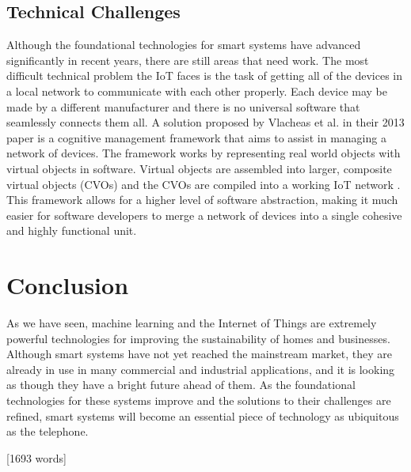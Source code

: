 \documentclass[letterpaper]{article}
\begin{document}
\subsection{Technical Challenges}
Although the foundational technologies for smart systems have advanced significantly in recent years, there are still areas that need work. The most difficult technical problem the IoT faces is the task of getting all of the devices in a local network to communicate with each other properly. Each device may be made by a different manufacturer and there is no universal software that seamlessly connects them all. A solution proposed by Vlacheas et al. \cite{vlacheas13} in their 2013 paper is a cognitive management framework that aims to assist in managing a network of devices. The framework works by representing real world objects with virtual objects in software. Virtual objects are assembled into larger, composite virtual objects (CVOs) and the CVOs are compiled into a working IoT network \cite{vlacheas13}. This framework allows for a higher level of software abstraction, making it much easier for software developers to merge a network of devices into a single cohesive and highly functional unit.

\section{Conclusion} \label{conc}
As we have seen, machine learning and the Internet of Things are extremely powerful technologies for improving the sustainability of homes and businesses. Although smart systems have not yet reached the mainstream market, they are already in use in many commercial and industrial applications, and it is looking as though they have a bright future ahead of them. As the foundational technologies for these systems improve and the solutions to their challenges are refined, smart systems will become an essential piece of technology as ubiquitous as the telephone.

\vfill\hfill
[1693 words]

\clearpage
\pagestyle{references}
\printbibliography
\end{document}
